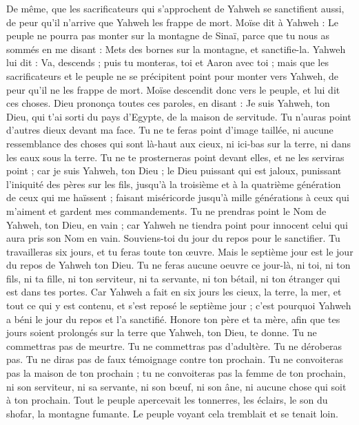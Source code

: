 \begin{multicols}{2}
De même, que les sacrificateurs qui s'approchent de Yahweh se sanctifient aussi, de peur qu'il n'arrive que Yahweh les frappe de mort.
Moïse dit à Yahweh : Le peuple ne pourra pas monter sur la montagne de Sinaï, parce que tu nous as sommés en me disant : Mets des bornes sur la montagne, et sanctifie-la.
Yahweh lui dit : Va, descends ; puis tu monteras, toi et Aaron avec toi ; mais que les sacrificateurs et le peuple ne se précipitent point pour monter vers Yahweh, de peur qu’il ne les frappe de mort.
Moïse descendit donc vers le peuple, et lui dit ces choses.
\VerseOne{}Dieu prononça toutes ces paroles, en disant :
Je suis Yahweh, ton Dieu, qui t'ai sorti du pays d'Egypte, de la maison de servitude.
Tu n'auras point d'autres dieux devant ma face.
Tu ne te feras point d'image taillée, ni aucune ressemblance des choses qui sont là-haut aux cieux, ni ici-bas sur la terre, ni dans les eaux sous la terre\FTNT{}.
Tu ne te prosterneras point devant elles, et ne les serviras point ; car je suis Yahweh, ton Dieu ; le Dieu puissant qui est jaloux, punissant l'iniquité des pères sur les fils, jusqu'à la troisième et à la quatrième génération de ceux qui me haïssent ;
faisant miséricorde jusqu’à mille générations à ceux qui m'aiment et gardent mes commandements.
Tu ne prendras point le Nom de Yahweh, ton Dieu, en vain ; car Yahweh ne tiendra point pour innocent celui qui aura pris son Nom en vain\FTNT{}.
Souviens-toi du jour du repos pour le sanctifier.
Tu travailleras six jours, et tu feras toute ton œuvre.
Mais le septième jour est le jour du repos de Yahweh ton Dieu. Tu ne feras aucune oeuvre ce jour-là, ni toi, ni ton fils, ni ta fille, ni ton serviteur, ni ta servante, ni ton bétail, ni ton étranger qui est dans tes portes.
Car Yahweh a fait en six jours les cieux, la terre, la mer, et tout ce qui y est contenu, et s'est reposé le septième jour ; c'est pourquoi Yahweh a béni le jour du repos et l’a sanctifié\FTNT{}.
Honore ton père et ta mère, afin que tes jours soient prolongés sur la terre que Yahweh, ton Dieu, te donne\FTNT{}.
Tu ne commettras pas de meurtre\FTNT{}.
Tu ne commettras pas d’adultère\FTNT{}.
Tu ne déroberas pas.
Tu ne diras pas de faux témoignage contre ton prochain.
Tu ne convoiteras pas la maison de ton prochain ; tu ne convoiteras pas la femme de ton prochain, ni son serviteur, ni sa servante, ni son bœuf, ni son âne, ni aucune chose qui soit à ton prochain.
Tout le peuple apercevait les tonnerres, les éclairs, le son du shofar, la montagne fumante. Le peuple voyant cela tremblait et se tenait loin.

\end{multicols}
